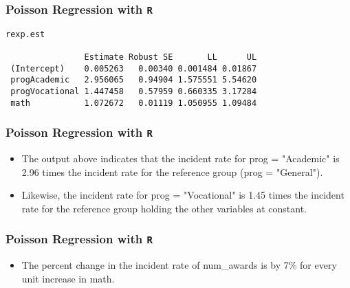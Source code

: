 \documentclass[00-GLMregslides.tex]{subfiles}
\begin{document}
\begin{frame}[fragile]

\frametitle{Poisson Regression with \texttt{R}}
\large

\begin{framed}
\begin{verbatim}
rexp.est
 
                Estimate Robust SE       LL      UL
 (Intercept)    0.005263   0.00340 0.001484 0.01867
 progAcademic   2.956065   0.94904 1.575551 5.54620
 progVocational 1.447458   0.57959 0.660335 3.17284
 math           1.072672   0.01119 1.050955 1.09484
\end{verbatim}
\end{framed}
\end{frame}
\begin{frame}[fragile]

\frametitle{Poisson Regression with \texttt{R}}
\Large 
\begin{itemize}
\item The output above indicates that the incident rate for prog = "Academic" is 2.96 times the incident rate for the reference group (prog = "General"). 
\item Likewise, the incident rate for prog = "Vocational" is 1.45 times the incident rate for the reference group holding the other variables at constant. 

\end{itemize}

\end{frame}
\begin{frame}[fragile]

\frametitle{Poisson Regression with \texttt{R}}
\Large 
\begin{itemize}
\item
The percent change in the incident rate of num\_awards is by 7\% for every unit increase in math. 
\end{itemize}
\end{frame}
\end{document}
